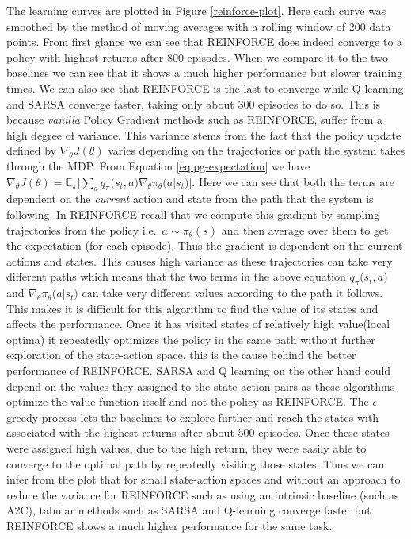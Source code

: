 \documentclass[12pt]{extarticle}
\numberwithin{equation}{section}
\begin{document}
	The learning curves are plotted in Figure \ref{reinforce-plot}. Here each curve was smoothed by the method of moving averages with a rolling window of 200 data points. From first glance we can see that REINFORCE does indeed converge to a policy with highest returns after 800 episodes. When we compare it to the two baselines we can see that it shows a much higher performance but slower training times. We can also see that REINFORCE is the last to converge while Q learning and SARSA converge  faster, taking only about 300 episodes to do so. This is because \textit{vanilla} Policy Gradient methods such as REINFORCE, suffer from a high degree of variance. This variance stems from the fact that the policy update defined by $\nabla_{\theta}J(\theta)$ varies depending on the trajectories or path the system takes through the MDP. From Equation \ref{eq:pg-expectation} we have $\nabla_{\theta}J(\theta)=\mathbb{E}_{\pi}\big[\sum_{a}q_{\pi}\big(s_t,a\big)\nabla_{\theta}\pi_{\theta}\big(a|s_t\big)\big]$. Here we can see that both the terms are dependent on the \textit{current} action and state from the path that the system is following. In REINFORCE recall that we compute this gradient by sampling trajectories from the policy i.e.\ $a \sim \pi_{\theta}(s)$ and then average over them to get the expectation (for each episode). Thus the gradient is dependent on the current actions and states. This causes high variance as these trajectories can take very different paths which means that the two terms in the above equation $q_{\pi}\big(s_t,a\big)$ and $\nabla_{\theta}\pi_{\theta}\big(a|s_t\big)$ can take very different values according to the path it follows. This makes it is difficult for this algorithm to find the value of its states and affects the performance. Once it has visited states of relatively high value(local optima) it repeatedly optimizes the policy in the same path without further exploration of the state-action space, this is the cause behind the better performance of REINFORCE. SARSA and Q learning on the other hand could depend on the values they assigned to the state action pairs as these algorithms optimize the value function itself and not the policy as REINFORCE. The $\epsilon$-greedy process lets the baselines to explore further and reach the states with associated with the highest returns after about 500 episodes. Once these states were assigned high values, due to the high return, they were easily  able to converge to the optimal path by repeatedly visiting those states. Thus we can infer from the plot that for small state-action spaces and without an approach to reduce the variance for REINFORCE such as using an intrinsic baseline (such as A2C), tabular methods such as SARSA and Q-learning converge faster but REINFORCE shows a much higher performance for the same task.
	
\end{document}
